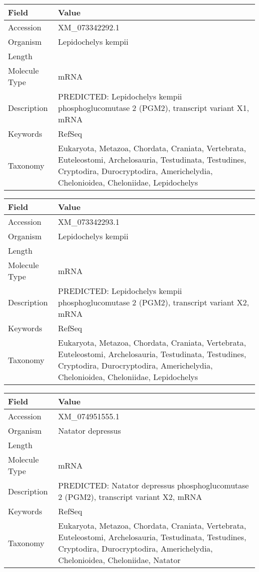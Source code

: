 \documentclass[10pt]{article}
\begin{document}
\vspace{1em}
{\footnotesize
\begin{longtable}{>{\raggedright\arraybackslash}p{4.5cm} >{\raggedright\arraybackslash}p{11.5cm}}
\textbf{Field} & \textbf{Value} \\
\hline
Accession & XM\_073342292.1 \\
Organism & Lepidochelys kempii \\
Length & 3775 \\
Molecule Type & mRNA \\
Description & PREDICTED: Lepidochelys kempii phosphoglucomutase 2 (PGM2), transcript variant X1, mRNA \\
Keywords & RefSeq \\
Taxonomy & Eukaryota, Metazoa, Chordata, Craniata, Vertebrata, Euteleostomi, Archelosauria, Testudinata, Testudines, Cryptodira, Durocryptodira, Americhelydia, Chelonioidea, Cheloniidae, Lepidochelys \\
\end{longtable}
}

\vspace{1em}
{\footnotesize
\begin{longtable}{>{\raggedright\arraybackslash}p{4.5cm} >{\raggedright\arraybackslash}p{11.5cm}}
\textbf{Field} & \textbf{Value} \\
\hline
Accession & XM\_073342293.1 \\
Organism & Lepidochelys kempii \\
Length & 1872 \\
Molecule Type & mRNA \\
Description & PREDICTED: Lepidochelys kempii phosphoglucomutase 2 (PGM2), transcript variant X2, mRNA \\
Keywords & RefSeq \\
Taxonomy & Eukaryota, Metazoa, Chordata, Craniata, Vertebrata, Euteleostomi, Archelosauria, Testudinata, Testudines, Cryptodira, Durocryptodira, Americhelydia, Chelonioidea, Cheloniidae, Lepidochelys \\
\end{longtable}
}

\vspace{1em}
{\footnotesize
\begin{longtable}{>{\raggedright\arraybackslash}p{4.5cm} >{\raggedright\arraybackslash}p{11.5cm}}
\textbf{Field} & \textbf{Value} \\
\hline
Accession & XM\_074951555.1 \\
Organism & Natator depressus \\
Length & 4223 \\
Molecule Type & mRNA \\
Description & PREDICTED: Natator depressus phosphoglucomutase 2 (PGM2), transcript variant X2, mRNA \\
Keywords & RefSeq \\
Taxonomy & Eukaryota, Metazoa, Chordata, Craniata, Vertebrata, Euteleostomi, Archelosauria, Testudinata, Testudines, Cryptodira, Durocryptodira, Americhelydia, Chelonioidea, Cheloniidae, Natator \\
\end{longtable}
}
\end{document}
